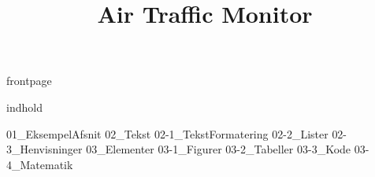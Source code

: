 \documentclass[a4paper]{article}								%
\title{Air Traffic Monitor}
\begin{document}

	{frontpage}

	\tableofcontents\thispagestyle{fancy} \newpage
	
	{indhold}

	\newpage
	{01_EksempelAfsnit} \newpage
	{02_Tekst} 
		{02-1_TekstFormatering}
		{02-2_Lister}
		{02-3_Henvisninger} \newpage
	{03_Elementer}
		{03-1_Figurer}
		{03-2_Tabeller}
		{03-3_Kode}
		{03-4_Matematik} \newpage


\end{document}
